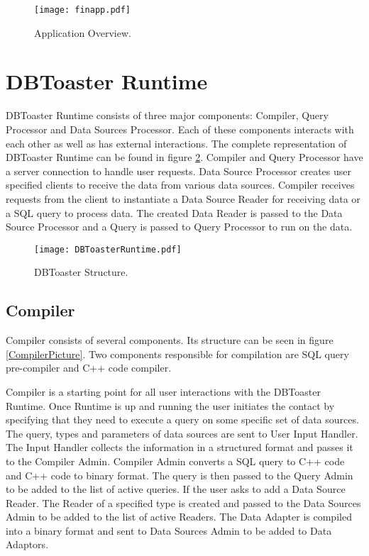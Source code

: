 \documentclass[11pt]{article}
\begin{document}
\begin{figure}
  \texttt{[image: finapp.pdf]}
  \caption{Application Overview.}
  \label{TheBigPicture}
\end{figure}



\section{DBToaster Runtime}

DBToaster Runtime consists of three major components: Compiler, Query Processor and Data Sources Processor. Each of these components interacts with each other as well as has external interactions. The complete representation of DBToaster Runtime can be found in figure \ref{DBToasterPic}. Compiler and Query Processor have a server connection to handle user requests. Data Source Processor creates user specified clients to receive the data from various data sources. Compiler receives requests from the client to instantiate a Data Source Reader for receiving data or a SQL query to process data. The created Data Reader is passed to the Data Source Processor and a Query is passed to Query Processor to run on the data. 

\begin{figure}
  \texttt{[image: DBToasterRuntime.pdf]}
  \caption{DBToaster Structure.}
  \label{DBToasterPic}
\end{figure}



\subsection{Compiler}

Compiler consists of several components. Its structure can be seen in figure \ref{CompilerPicture}. Two components responsible for compilation are SQL query pre-compiler and C++ code compiler. 

Compiler is a starting point for all user interactions with the DBToaster Runtime. Once Runtime is up and running the user initiates the contact by specifying that they need to execute a query on some specific set of data sources. The query, types and parameters of data sources are sent to User Input Handler. The Input Handler collects the information in a structured format and passes it to the Compiler Admin. Compiler Admin converts a SQL query to C++ code and C++ code to binary format. The query is then passed to the Query Admin to be added to the list of active queries. If the user asks to add a Data Source Reader. The Reader of a specified type is created and passed to the Data Sources Admin to be added to the list of active Readers. The Data Adapter is compiled into a binary format and sent to Data Sources Admin to be added to Data Adaptors. 
\end{document}
